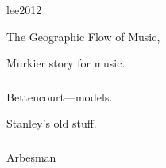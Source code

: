lee2012

{The Geographic Flow of Music},

Murkier story for music.

\begin{frame}
  \frametitle{}

  Bettencourt---models.

  Stanley's old stuff.
\end{frame}

\begin{frame}
  \frametitle{}

  Arbesman

  \cite{arbesman2009a}

\end{frame}
